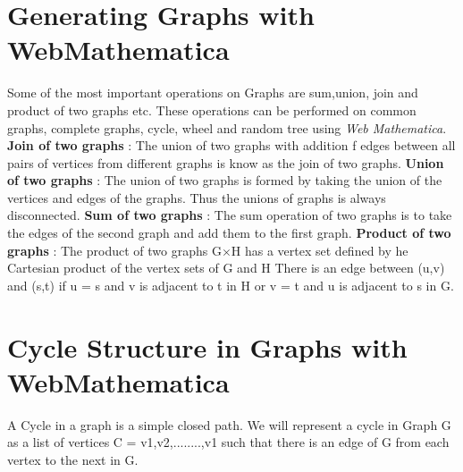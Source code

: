\documentclass{article}
\begin{document}
\section{Generating Graphs with  WebMathematica}
Some of the most important operations on Graphs are sum,union, join and product of two graphs etc. These operations can be performed on common graphs, complete graphs, cycle, wheel and random tree using \emph{\textit{Web Mathematica}}. \hfill \break
\textbf{Join of two graphs} : The union of two graphs with addition f edges between all pairs of vertices from different graphs is know as the join of two graphs. \hfill \break
 \textbf{Union of two graphs} : The union of two graphs is formed by taking the union of the vertices and edges of the graphs. Thus the unions of graphs is always disconnected. \hfill \break
 \textbf{Sum of two graphs} : The sum operation of two graphs is to take the edges of the second graph and add them to the first graph. \hfill \break
 \textbf{Product of two graphs} : The product of two graphs G\( \times \)H has a vertex set defined by he Cartesian product of the vertex sets of G and H
 There is an edge between (u,v) and (s,t) if u = s and v is adjacent to t in H or
  v = t and u is adjacent to s in G. \hfill \break
 
 \section{Cycle Structure in Graphs with  \hfill \break WebMathematica}
 A Cycle in a graph is a simple closed path. We will represent a cycle in Graph G as a list of vertices C = v1,v2,........,v1 such that there is an edge of G from each vertex to the next in G.
 
\end{document}
